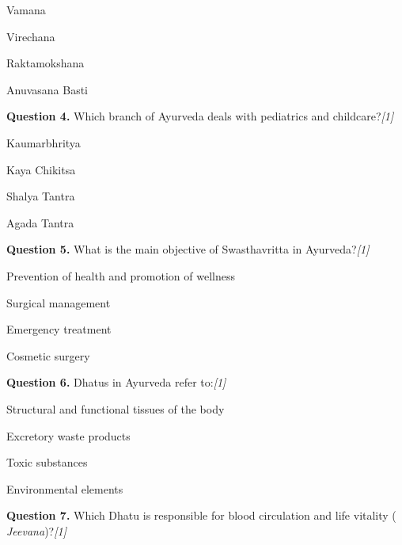 \documentclass[11pt,a4paper]{article}
\newcommand{\pts}[1]{\hfill   \textit{[#1]}}
\begin{document}
\begin{parts}
  \item Vamana
  \item Virechana
  \item Raktamokshana
  \item Anuvasana Basti
\end{parts}

\medskip




\noindent   \textbf{Question 4.} Which branch of Ayurveda deals with pediatrics and childcare?\pts{1}

\begin{parts}
  \item Kaumarbhritya
  \item Kaya Chikitsa
  \item Shalya Tantra
  \item Agada Tantra
\end{parts}

\medskip




\noindent   \textbf{Question 5.} What is the main objective of Swasthavritta in Ayurveda?\pts{1}

\begin{parts}
  \item Prevention of health and promotion of wellness
  \item Surgical management
  \item Emergency treatment
  \item Cosmetic surgery
\end{parts}

\medskip




\noindent   \textbf{Question 6.} Dhatus in Ayurveda refer to:\pts{1}

\begin{parts}
  \item Structural and functional tissues of the body
  \item Excretory waste products
  \item Toxic substances
  \item Environmental elements
\end{parts}

\medskip




\noindent   \textbf{Question 7.} Which Dhatu is responsible for blood circulation and life vitality (   \textit{Jeevana})?\pts{1}
\end{document}
